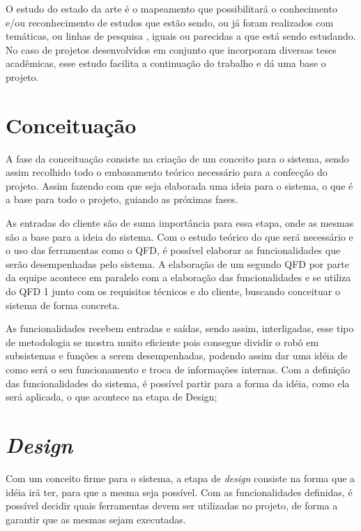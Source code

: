 O estudo do estado da arte é o mapeamento que possibilitará o conhecimento e/ou reconhecimento de estudos que estão sendo, ou já foram realizados com temáticas, ou linhas de pesquisa , iguais ou parecidas a que está sendo estudando. No caso de projetos desenvolvidos em conjunto que incorporam diversas teses acadêmicas, esse estudo facilita a continuação do trabalho e dá uma base o projeto.

\section{Conceituação}
\label{sec:conc}
A fase da conceituação consiste na criação de um conceito para o sistema, sendo assim recolhido todo o embasamento teórico necessário para a confecção do projeto. Assim fazendo com que seja elaborada uma ideia para o sistema, o que é a base para todo o projeto, guiando as próximas fases.

As entradas do cliente são de suma importância para essa etapa, onde as mesmas são a base para a ideia do sistema. Com o estudo teórico do que será necessário e o uso das ferramentas como o QFD, é possível elaborar as funcionalidades que serão desempenhadas pelo sistema. A elaboração de um segundo QFD por parte da equipe acontece em paralelo com a elaboração das funcionalidades e se utiliza do QFD 1 junto com os requisitos técnicos e do cliente, buscando conceituar o sistema de forma concreta.

As funcionalidades recebem entradas e saídas, sendo assim, interligadas, esse tipo de metodologia se mostra muito eficiente pois consegue dividir o robô em subsistemas e funções a serem desempenhadas, podendo assim dar uma idéia de como será o seu funcionamento e troca de informações internas. Com a definição das funcionalidades do sistema, é possível partir para a forma da idéia, como ela será aplicada, o que acontece na etapa de Design;  


\section{\textit{Design}}
\label{sec:design}
Com um conceito firme para o sistema, a etapa de \textit{design} consiste na forma que a idéia irá ter, para que a mesma seja possível. Com as funcionalidades definidas, é possível decidir quais ferramentas devem ser utilizadas no projeto, de forma a garantir que as mesmas sejam executadas. 

